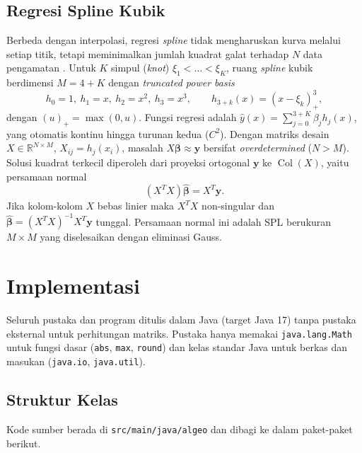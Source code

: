 \documentclass[12pt,a4paper]{article}
\begin{document}
\subsection{Regresi Spline Kubik}
Berbeda dengan interpolasi, regresi \textit{spline} tidak mengharuskan kurva melalui setiap titik, tetapi meminimalkan jumlah kuadrat galat terhadap $N$ data pengamatan \cite{hastie,james}. Untuk $K$ simpul (\textit{knot}) $\xi_1<\dots<\xi_K$, ruang \textit{spline} kubik berdimensi $M=4+K$ dengan \textit{truncated power basis}
\begin{equation}
  h_0=1,\ h_1=x,\ h_2=x^2,\ h_3=x^3,\qquad h_{3+k}(x)=(x-\xi_k)_+^3,
\end{equation}
dengan $(u)_+=\max(0,u)$. Fungsi regresi adalah $\hat y(x)=\sum_{j=0}^{3+K}\beta_jh_j(x)$, yang otomatis kontinu hingga turunan kedua ($C^2$). Dengan matriks desain $X\in\mathbb{R}^{N\times M}$, $X_{ij}=h_j(x_i)$, masalah $X\boldsymbol\beta\approx\mathbf{y}$ bersifat \textit{overdetermined} ($N>M$). Solusi kuadrat terkecil diperoleh dari proyeksi ortogonal $\mathbf{y}$ ke $\operatorname{Col}(X)$, yaitu persamaan normal
\begin{equation}
  (X^{T}X)\hat{\boldsymbol\beta}=X^{T}\mathbf{y}.
\end{equation}
Jika kolom-kolom $X$ bebas linier maka $X^TX$ non-singular dan $\hat{\boldsymbol\beta}=(X^TX)^{-1}X^T\mathbf{y}$ tunggal. Persamaan normal ini adalah SPL berukuran $M\times M$ yang diselesaikan dengan eliminasi Gauss.

\section{Implementasi}

Seluruh pustaka dan program ditulis dalam Java (target Java 17) tanpa pustaka eksternal untuk perhitungan matriks. Pustaka hanya memakai \texttt{java.lang.Math} untuk fungsi dasar (\texttt{abs}, \texttt{max}, \texttt{round}) dan kelas standar Java untuk berkas dan masukan (\texttt{java.io}, \texttt{java.util}).

\subsection{Struktur Kelas}
Kode sumber berada di \texttt{src/main/java/algeo} dan dibagi ke dalam paket-paket berikut.
\end{document}

